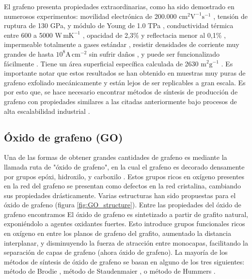 El grafeno presenta propiedades extraordinarias, como ha sido demostrado en numerosos experimentos: movilidad electrónica de 200.000 $\mathrm{cm^2 V^{-1} s^{-1} }$ \citep{Bolotin2008}, tensión de ruptura de 130 GPa, y módulo de Young de 1.0 TPa \citep{Lee2008}, conductividad térmica entre 600 a 5000 $\mathrm{W\, mK^{-1}}$ \citep{Balandin2011}, opacidad de 2,3\% y reflectacia menor al 0,1\% \citep{Nair2008}, impermeable totalmente a gases estándar \citep{Bunch2007}, resistir densidades de corriente muy grandes de hasta $\mathrm{10^8 A\, cm^{-2}}$ sin sufrir daños  \citep{Moser2007}, y puede ser funcionalizado fácilmente \citep{Loh2010}. Tiene un área superficial específica calculada de 2630 $\mathrm{m^2 g^{-1}}$ \citep{Peigney2001}. Es importante notar que estos resultados se han obtenido en muestras muy puras de grafeno exfoliado mecánicamente \citep{Novoselov2004} y están lejos de ser replicables a gran escala. Es por esto que, se hace necesario encontrar métodos de síntesis de producción de grafeno con propiedades similares a las citadas anteriormente bajo procesos de alta escalabilidad industrial \citep{Novoselov2012}.

\subsection{Óxido de grafeno (GO)}
Una de las formas de obtener grandes cantidades de grafeno es mediante la llamada ruta de "óxido de grafeno", en la cual el grafeno es decorado densamente por grupos epóxi, hidroxilo, y carboxilo \citep{Dreyer2010}. Estos grupos ricos en oxígeno presentes en la red del grafeno se presentan como defectos en la red cristalina, cambiando sus propiedades drásticamente. Varias estructuras han sido propuestas para el óxido de grafeno (figura \ref{fig:GO_structure}). Entre las propiedades del óxido de grafeno encontramos
El óxido de grafeno es sintetizado a partir de grafito natural, exponiéndolo a agentes oxidantes fuertes. Esto introduce grupos funcionales ricos en oxígeno en entre los planos de grafeno del grafito, aumentado la distancia interplanar, y disminuyendo la fuerza de atracción entre monocapas, facilitando la separación de capas de grafeno (ahora óxido de grafeno). La mayoría de los métodos de síntesis de óxido de grafeno se basan en alguno de los tres siguientes: método de Brodie \citep{Brodie1859}, método de Staudenmaier \citep{Staudenmaier1898}, o método de Hummers \citep{Hummers1958}.


